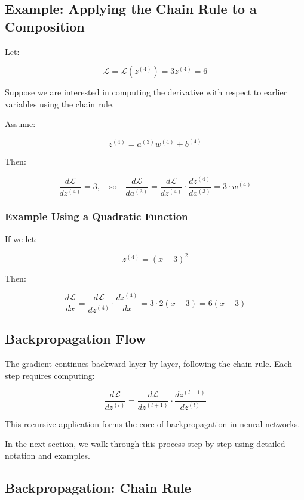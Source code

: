 \subsection{Example: Applying the Chain Rule to a Composition}

Let:

\[
\mathcal{L} = \mathcal{L}(z^{(4)}) = 3z^{(4)} = 6
\]

Suppose we are interested in computing the derivative with respect to earlier variables using the chain rule.

Assume:

\[
z^{(4)} = a^{(3)} w^{(4)} + b^{(4)}
\]

Then:

\[
\frac{d\mathcal{L}}{dz^{(4)}} = 3, \quad \text{so}
\quad \frac{d\mathcal{L}}{da^{(3)}} = \frac{d\mathcal{L}}{dz^{(4)}} \cdot \frac{dz^{(4)}}{da^{(3)}}
= 3 \cdot w^{(4)}
\]

\subsubsection*{Example Using a Quadratic Function}

If we let:

\[
z^{(4)} = (x - 3)^2
\]

Then:

\[
\frac{d\mathcal{L}}{dx} = \frac{d\mathcal{L}}{dz^{(4)}} \cdot \frac{dz^{(4)}}{dx}
= 3 \cdot 2(x - 3) = 6(x - 3)
\]

\subsection{Backpropagation Flow}

The gradient continues backward layer by layer, following the chain rule. Each step requires computing:

\[
\frac{d\mathcal{L}}{dz^{(l)}} = \frac{d\mathcal{L}}{dz^{(l+1)}} \cdot \frac{dz^{(l+1)}}{dz^{(l)}}
\]

This recursive application forms the core of backpropagation in neural networks.

\bigskip

In the next section, we walk through this process step-by-step using detailed notation and examples.

\subsection{Backpropagation: Chain Rule}

